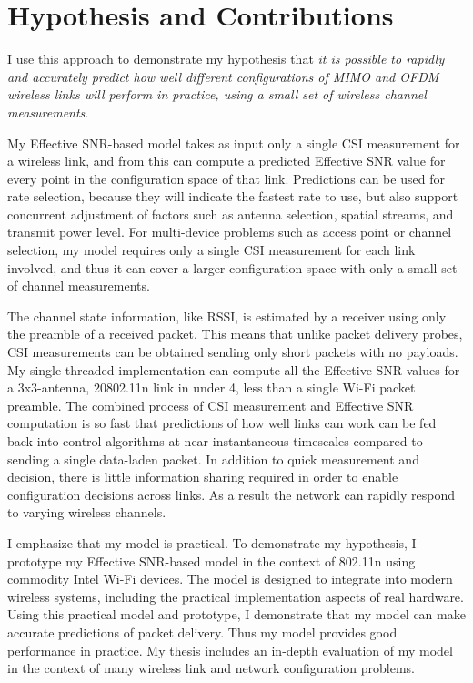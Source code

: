 \section{Hypothesis and Contributions}
I use this approach to demonstrate my hypothesis that \emph{it is possible to rapidly and accurately predict how well different configurations of MIMO and OFDM wireless links will perform in practice, using a small set of wireless channel measurements}.

My Effective SNR-based model takes as input only a single CSI measurement for a wireless link, and from this can compute a predicted Effective SNR value for every point in the configuration space of that link. Predictions can be used for rate selection, because they will indicate the fastest rate to use, but also support concurrent adjustment of factors such as antenna selection, spatial streams, and transmit power level. For multi-device problems such as access point or channel selection, my model requires only a single CSI measurement for each link involved, and thus it can cover a larger configuration space with only a small set of channel measurements.

The channel state information, like RSSI, is estimated by a receiver using only the preamble of a received packet. This means that unlike packet delivery probes, CSI measurements can be obtained sending only short packets with no payloads. My single-threaded implementation can compute all the Effective SNR values for a 3x3-antenna, 20\MHz 802.11n link in under 4\us, less than a single Wi-Fi packet preamble. The combined process of CSI measurement and Effective SNR computation is so fast that predictions of how well links can work can be fed back into control algorithms at near-instantaneous timescales compared to sending a single data-laden packet.
In addition to quick measurement and decision, there is little information sharing required in order to enable configuration decisions across links. As a result the network can rapidly respond to varying wireless channels.

I emphasize that my model is practical. To demonstrate my hypothesis, I prototype my Effective SNR-based model in the context of 802.11n using commodity Intel Wi-Fi devices. The model is designed to integrate into modern wireless systems, including the practical implementation aspects of real hardware. Using this practical model and prototype, I demonstrate that my model can make accurate predictions of packet delivery. Thus my model provides good performance in practice. My thesis includes an in-depth evaluation of my model in the context of many wireless link and network configuration problems.

